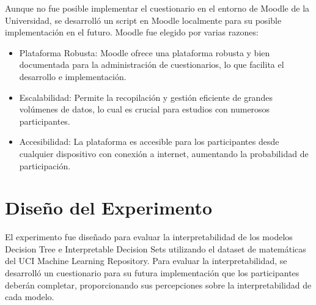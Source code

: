 Aunque no fue posible implementar el cuestionario en el entorno de Moodle de la Universidad, se desarrolló un script en Moodle localmente para su posible implementación en el futuro. Moodle fue elegido por varias razones:
\begin{itemize}
    \item Plataforma Robusta: Moodle ofrece una plataforma robusta y bien documentada para la administración de cuestionarios, lo que facilita el desarrollo e implementación.
    \item Escalabilidad: Permite la recopilación y gestión eficiente de grandes volúmenes de datos, lo cual es crucial para estudios con numerosos participantes.
    \item Accesibilidad: La plataforma es accesible para los participantes desde cualquier dispositivo con conexión a internet, aumentando la probabilidad de participación.
\end{itemize}

\section{Diseño del Experimento}

El experimento fue diseñado para evaluar la interpretabilidad de los modelos Decision Tree e Interpretable Decision Sets utilizando el dataset de matemáticas del UCI Machine Learning Repository. Para evaluar la interpretabilidad, se desarrolló un cuestionario para su futura implementación que los participantes deberán completar, proporcionando sus percepciones sobre la interpretabilidad de cada modelo.

